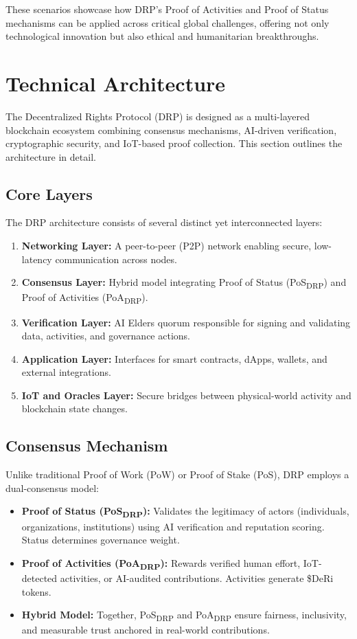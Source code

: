 \documentclass[11pt,a4paper]{article}
\begin{document}
These scenarios showcase how DRP’s Proof of Activities and Proof of Status mechanisms can be applied across critical global challenges, offering not only technological innovation but also ethical and humanitarian breakthroughs.

\section{Technical Architecture}

The Decentralized Rights Protocol (DRP) is designed as a multi-layered blockchain ecosystem combining consensus mechanisms, AI-driven verification, cryptographic security, and IoT-based proof collection. This section outlines the architecture in detail.

\subsection{Core Layers}
The DRP architecture consists of several distinct yet interconnected layers:

\begin{enumerate}
    \item \textbf{Networking Layer:} A peer-to-peer (P2P) network enabling secure, low-latency communication across nodes.  
    \item \textbf{Consensus Layer:} Hybrid model integrating Proof of Status (PoS\textsubscript{DRP}) and Proof of Activities (PoA\textsubscript{DRP}).  
    \item \textbf{Verification Layer:} AI Elders quorum responsible for signing and validating data, activities, and governance actions.  
    \item \textbf{Application Layer:} Interfaces for smart contracts, dApps, wallets, and external integrations.  
    \item \textbf{IoT and Oracles Layer:} Secure bridges between physical-world activity and blockchain state changes.  
\end{enumerate}

\subsection{Consensus Mechanism}
Unlike traditional Proof of Work (PoW) or Proof of Stake (PoS), DRP employs a dual-consensus model:

\begin{itemize}
    \item \textbf{Proof of Status (PoS\textsubscript{DRP}):} Validates the legitimacy of actors (individuals, organizations, institutions) using AI verification and reputation scoring. Status determines governance weight.  
    \item \textbf{Proof of Activities (PoA\textsubscript{DRP}):} Rewards verified human effort, IoT-detected activities, or AI-audited contributions. Activities generate \$DeRi tokens.  
    \item \textbf{Hybrid Model:} Together, PoS\textsubscript{DRP} and PoA\textsubscript{DRP} ensure fairness, inclusivity, and measurable trust anchored in real-world contributions.  
\end{itemize}
\end{document}
